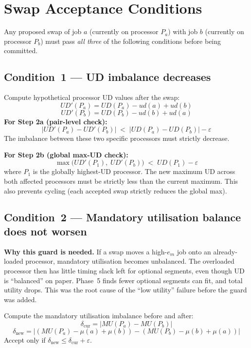 \documentclass[10pt,twocolumn]{article}
\begin{document}
\section{Swap Acceptance Conditions}

Any proposed swap of job $a$ (currently on processor $P_a$) with job $b$
(currently on processor $P_b$) must pass \emph{all three} of the following
conditions before being committed.

\subsection*{Condition~1 --- UD imbalance decreases}

Compute hypothetical processor UD values after the swap:
\[
  UD'(P_a) = UD(P_a) - ud(a) + ud(b)
\]
\[
  UD'(P_b) = UD(P_b) - ud(b) + ud(a)
\]
\textbf{For Step 2a (pair-level check):}
\[
  |UD'(P_a) - UD'(P_b)| \;<\; |UD(P_a) - UD(P_b)| - \varepsilon
\]
The imbalance between these two specific processors must strictly decrease.

\textbf{For Step 2b (global max-UD check):}
\[
  \max\bigl(UD'(P_1),\; UD'(P_b)\bigr) \;<\; UD(P_1) - \varepsilon
\]
where $P_1$ is the globally highest-UD processor. The new maximum UD across
both affected processors must be strictly less than the current maximum.
This also prevents cycling (each accepted swap strictly reduces the global max).

\subsection*{Condition~2 --- Mandatory utilisation balance does not worsen}

\begin{yellowbox}
\textbf{Why this guard is needed.}
If a swap moves a high-$e_m$ job onto an already-loaded processor,
mandatory utilisation becomes unbalanced. The overloaded processor then
has little timing slack left for optional segments, even though UD is
``balanced'' on paper. Phase~5 finds fewer optional segments can fit,
and total utility drops. This was the root cause of the ``low utility''
failure before the guard was added.
\end{yellowbox}

Compute the mandatory utilisation imbalance before and after:
\[
  \delta_{\text{cur}} = |MU(P_a) - MU(P_b)|
\]
\[
  \delta_{\text{new}} = \bigl|(MU(P_a) - \mu(a) + \mu(b)) -
                               (MU(P_b) - \mu(b) + \mu(a))\bigr|
\]
Accept only if $\delta_{\text{new}} \leq \delta_{\text{cur}} + \varepsilon$.
\end{document}
